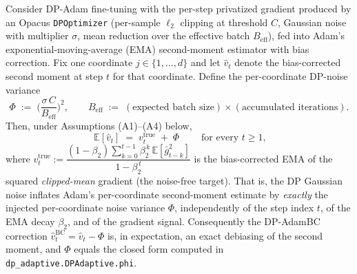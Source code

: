 \begin{theorem}
\label{thm:vhat-bias}
Consider DP-Adam fine-tuning with the per-step privatized gradient produced by an Opacus
\texttt{DPOptimizer} (per-sample $\ell_2$ clipping at threshold $C$, Gaussian noise with
multiplier $\sigma$, mean reduction over the effective batch $B_{\mathrm{eff}}$), fed into
Adam's exponential-moving-average (EMA) second-moment estimator with bias correction.
Fix one coordinate $j\in\{1,\dots,d\}$ and let $\hat v_t$ denote the bias-corrected
second moment at step $t$ for that coordinate. Define the per-coordinate DP-noise variance
\[
\Phi \;:=\; \Big(\frac{\sigma\,C}{B_{\mathrm{eff}}}\Big)^{2},
\qquad
B_{\mathrm{eff}} \;:=\; (\text{expected batch size})\times(\text{accumulated iterations}).
\]
Then, under Assumptions \textnormal{(A1)--(A4)} below,
\[
\boxed{\;\mathbb{E}[\hat v_t] \;=\; v^{\mathrm{true}}_t \;+\; \Phi\;}
\qquad\text{for every }t\ge 1,
\]
where $v^{\mathrm{true}}_t := \dfrac{(1-\beta_2)\sum_{k=0}^{t-1}\beta_2^{\,k}\,\mathbb{E}[\bar g_{t-k}^2]}{1-\beta_2^{\,t}}$
is the bias-corrected EMA of the squared \emph{clipped-mean} gradient (the noise-free target).
That is, the DP Gaussian noise inflates Adam's per-coordinate second-moment estimate by
\emph{exactly} the injected per-coordinate noise variance $\Phi$, independently of the step
index $t$, of the EMA decay $\beta_2$, and of the gradient signal. Consequently the DP-AdamBC
correction $\hat v_t^{\mathrm{BC}}=\hat v_t-\Phi$ is, in expectation, an exact debiasing of the
second moment, and $\Phi$ equals the closed form computed in
\texttt{dp\_adaptive.DPAdaptive.phi}.
\end{theorem}

